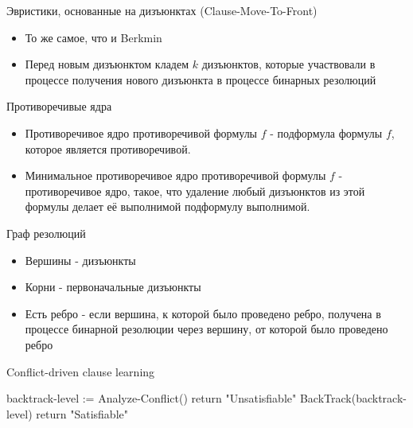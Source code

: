 \documentclass{beamer}
\begin{document}
\begin{frame}{Эвристики, основанные на дизъюнктах (Clause-Move-To-Front)}
\begin{itemize}
\item То же самое, что и Berkmin
\item Перед новым дизъюнктом кладем $k$ дизъюнктов, которые участвовали в процессе получения нового дизъюнкта в процессе
бинарных резолюций
\end{itemize}
\end{frame}

\begin{frame}{Противоречивые ядра}
\begin{itemize}
\item Противоречивое ядро противоречивой формулы $f$ - подформула формулы $f$, которое является противоречивой.
\item Минимальное противоречивое ядро противоречивой формулы $f$ - противоречивое ядро, такое, что удаление любый дизъюнктов из
этой формулы делает её выполнимой подформулу выполнимой.
\end{itemize}
\end{frame}

\begin{frame}{Граф резолюций}
\begin{itemize}
\item Вершины - дизъюнкты
\item Корни - первоначальные дизъюнкты
\item Есть ребро - если вершина, к которой было проведено ребро, получена в процессе бинарной резолюции через вершину, от
которой было проведено ребро
\end{itemize}
\end{frame}

\begin{frame}{Conflict-driven clause learning}
\begin{algorithmic}
            \State backtrack-level := Analyze-Conflict()
                \State return "Unsatisfiable"
            \EndIf
            \State BackTrack(backtrack-level)
                \State return "Satisfiable"
            \EndIf
        \EndWhile
    \EndWhile
\EndFunction
\end{algorithmic}
\end{frame}
\end{document}
